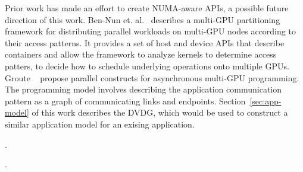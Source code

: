 Prior work has made an effort to create NUMA-aware APIs, a possible future direction of this work.
Ben-Nun et. al.~\cite{ben2015memory} describes a multi-GPU partitioning framework for distributing parallel workloads on multi-GPU nodes according to their access patterns.
It provides a set of host and device APIs that describe containers and allow the framework to analyze kernels to determine access patters, to decide how to schedule underlying operations onto multiple GPUs.
Groute ~\cite{ben2017groute} propose parallel constructs for asynchronous multi-GPU programming.
The programming model involves describing the application communication pattern as a graph of communicating links and endpoints.
Section~\ref{sec:app-model} of this work describes the DVDG, which would be used to construct a similar application model for an exising application.

.

.

